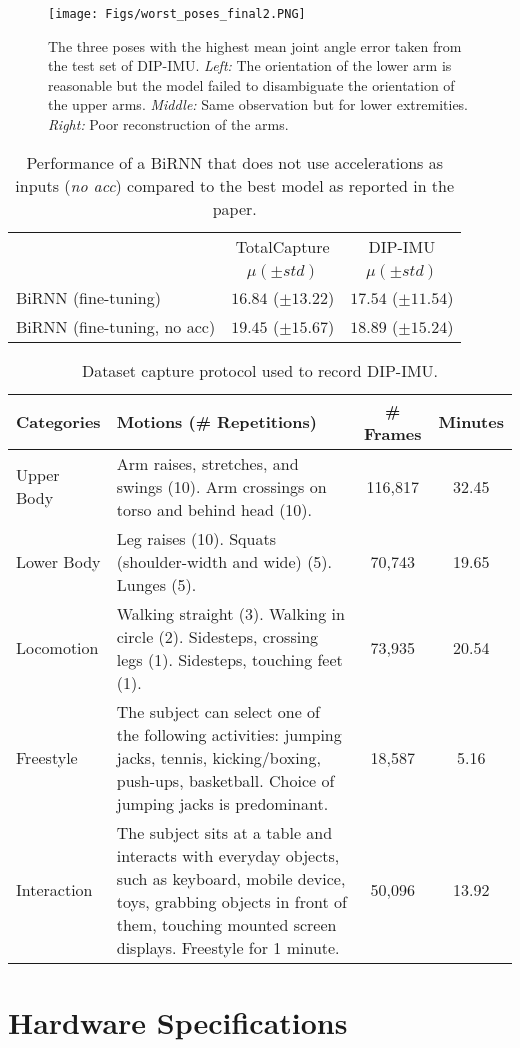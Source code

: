 \documentclass[acmtog]{acmart}
\begin{document}
\begin{figure}[bht]
\texttt{[image: Figs/worst\_poses\_final2.PNG]}
\caption{The three poses with the highest mean joint angle error taken from the test set of DIP-IMU. \emph{Left:} The orientation of the lower arm is reasonable but the model failed to disambiguate the orientation of the upper arms. \emph{Middle:} Same observation  but for lower extremities. \emph{Right:} Poor reconstruction of the arms.}
\label{fig:worst_poses}
\end{figure}\begin{table}[tbh]
	\caption{Performance of a BiRNN that does not use accelerations as inputs (\emph{no acc}) compared to the best model as reported in the paper.}

	\begin{tabular}{l c c}
		\toprule
		& {TotalCapture} & {DIP-IMU}\\
		& $\mu (\pm std)$  & $\mu (\pm std)$ \\
		\hline
		BiRNN (fine-tuning) & $16.84$ ($\pm 13.22$) & $17.54$ ($\pm 11.54$) \\
		\hline
        BiRNN (fine-tuning, no acc) & $19.45$ ($\pm 15.67$) & $18.89$ ($\pm 15.24$) \\
        \hline
	\end{tabular}
    \label{tab:acc_influence}
\end{table}\begin{table*}[bht]
\caption{Dataset capture protocol used to record DIP-IMU.} 
\label{tab:data_recording}
\begin{tabular}{ l p{12.5cm} c c}
\toprule
Categories & Motions (\# Repetitions) & \# Frames & Minutes\\
\hline
Upper Body &  
Arm raises, stretches, and swings (10). 
Arm crossings on torso and behind head (10). 
& 116,817 & 32.45 \\
\hline
Lower Body & 
Leg raises (10). 
Squats (shoulder-width and wide) (5).
Lunges (5). 
& 70,743 & 19.65\\
\hline
Locomotion & 
Walking straight (3). 
Walking in circle (2). 
Sidesteps, crossing legs (1). 
Sidesteps, touching feet (1).
& 73,935 & 20.54\\
\hline
Freestyle & 
The subject can select one of the following activities: jumping jacks, tennis, kicking/boxing, push-ups, basketball. Choice of jumping jacks is predominant. 
& 18,587  & 5.16\\
\hline
Interaction & 
The subject sits at a table and interacts with everyday objects, such as keyboard, mobile device, toys, grabbing objects in front of them, touching mounted screen displays. Freestyle for 1 minute.
& 50,096 & 13.92\\
\hline
\end{tabular}
\end{table*}\section{Hardware Specifications}\label{sec:hardware_specs}
\end{document}
